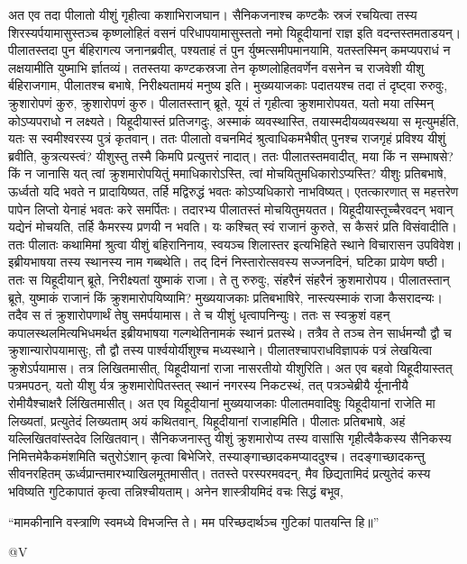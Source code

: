 \adhyAya
\vspace{25pt}
\vakya अत एव तदा पीलातो यीशुं गृहीत्वा कशाभिराजघान।
\vakya सैनिकजनाश्च कण्टकैः स्रजं रचयित्वा तस्य शिरस्यर्पयामासुस्तञ्च कृष्णलोहितं वसनं परिधापयामासुस्ततो
\vakya नमो यिहूदीयानां राज्ञ इति वदन्तस्तमताडयन्।
\vakya पीलातस्तदा पुन र्बहिरागत्य जनानब्रवीत्, पश्यताहं तं पुन र्युष्मत्समीपमानयामि, यतस्तस्मिन् कमप्यपराधं न लक्षयामीति युष्माभि र्ज्ञातव्यं।
\vakya ततस्तया कण्टकस्रजा तेन कृष्णलोहितवर्णेन वसनेन च राजवेशी यीशु र्बहिराजगाम, पीलातश्च बभाषे, निरीक्ष्यतामयं मनुष्य इति।
\vakya मुख्ययाजकाः पदातयश्च तदा तं दृष्ट्वा रुरुवुः, क्रुशारोपणं कुरु, क्रुशारोपणं कुरु। पीलातस्तान् ब्रूते, यूयं तं गृहीत्वा क्रुशमारोपयत, यतो मया तस्मिन् कोऽप्यपराधो न लक्ष्यते।
\vakya यिहूदीयास्तं प्रतिजगदुः, अस्माकं व्यवस्थास्ति, तयास्मदीयव्यवस्थया स मृत्युमर्हति, यतः स स्वमीश्वरस्य पुत्रं कृतवान्।
\vakya ततः पीलातो वचनमिदं श्रुत्वाधिकमभैषीत् पुनश्च राजगृहं प्रविश्य यीशुं ब्रवीति, कुत्रत्यस्त्वं?
\vakya यीशुस्तु तस्मै किमपि प्रत्युत्तरं नादात्।
\vakya ततः पीलातस्तमवादीत्, मया किं न सम्भाषसे? किं न जानासि यत् त्वां क्रुशमारोपयितुं ममाधिकारोऽस्ति, त्वां मोचयितुमधिकारोऽप्यस्ति?
\vakya यीशुः प्रतिबभाषे, ऊर्ध्वतो यदि भवते न प्रादायिष्यत, तर्हि मद्विरुद्धं भवतः कोऽप्यधिकारो नाभविष्यत्।
\vakya एतत्कारणात् स महत्तरेण पापेन लिप्तो येनाहं भवतः करे समर्पितः। तदारभ्य पीलातस्तं मोचयितुमयतत। यिहूदीयास्तूच्चैरवदन् भवान् यद्येनं मोचयति, तर्हि कैमरस्य प्रणयी न भवति। यः कश्चित् स्वं राजानं कुरुते, स कैसरं प्रति विसंवादीति।
\vakya ततः पीलातः कथामिमां श्रुत्वा यीशुं बहिरानिनाय, स्वयञ्च शिलास्तर इत्यभिहिते स्थाने विचारासन उपविवेश। इब्रीयभाषया तस्य स्थानस्य नाम गब्बथेति।
\vakya तद् दिनं निस्तारोत्सवस्य सज्जनदिनं, घटिका प्रायेण षष्ठी। ततः स यिहूदीयान् ब्रूते, निरीक्ष्यतां युष्माकं राजा।
\vakya ते तु रुरुवुः, संहरैनं संहरैनं क्रुशमारोपय। पीलातस्तान् ब्रूते, युष्माकं राजानं किं क्रुशमारोपयिष्यामि? मुख्ययाजकाः प्रतिबभाषिरे, नास्त्यस्माकं राजा कैसरादन्यः।
\vakya तदैव स तं क्रुशारोपणार्थं तेषु समर्पयामास। ते च यीशुं धृत्वापनिन्युः।
\vakya ततः स स्वक्रुशं वहन् कपालस्थलमित्यभिधमर्थत इब्रीयभाषया गल्गथेतिनामकं स्थानं प्रतस्थे।
\vakya तत्रैव ते तञ्च तेन सार्धमन्यौ द्वौ च क्रुशान्यारोपयामासुः, तौ द्वौ तस्य पार्श्वयोर्यीशुश्च मध्यस्थाने।
\vakya पीलातश्चापराधविज्ञापकं पत्रं लेखयित्वा क्रुशेऽर्पयामास। तत्र लिखितमासीत्, यिहूदीयानां राजा नासरतीयो यीशुरिति।
\vakya अत एव बहवो यिहूदीयास्तत् पत्रमपठन्, यतो यीशु र्यत्र क्रुशमारोपितस्तत् स्थानं नगरस्य निकटस्थं, तत् पत्रञ्चेब्रीयै र्यूनानीयै रोमीयैश्चाक्षरै र्लिखितमासीत्।
\vakya अत एव यिहूदीयानां मुख्ययाजकाः पीलातमवादिषुः यिहूदीयानां राजेति मा लिख्यतां, प्रत्युतेदं लिख्यताम् अयं कथितवान्, यिहूदीयानां राजाहमिति।
\vakya पीलातः प्रतिबभाषे, अहं यल्लिखितवांस्तदेव लिखितवान्।
\vakya सैनिकजनास्तु यीशुं क्रुशमारोप्य तस्य वासांसि गृहीत्वैकैकस्य सैनिकस्य निमित्तमेकैकमंशमिति चतुरोऽंशान् कृत्वा बिभेजिरे, तस्याङ्गाच्छादकमप्याददुश्च। तदङ्गाच्छादकन्तु सीवनरहितम् ऊर्ध्वप्रान्तमारभ्याखिलमूतमासीत्।
\vakya ततस्ते परस्परमवदन्, मैव छिद्यतामिदं प्रत्युतेदं कस्य भविष्यति गुटिकापातं कृत्वा तन्निश्चीयताम्। अनेन शास्त्रीयमिदं वचः सिद्धं बभूव,
\begin{poem}
\startwithline “मामकीनानि वस्त्राणि स्वमध्ये विभजन्ति ते।
\pline मम परिच्छदार्थञ्च गुटिकां पातयन्ति हि॥”
\end{poem}
@V\eoc